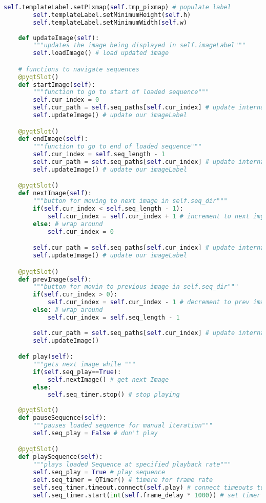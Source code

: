 \begin{lstlisting}[language=Python, caption={GUI Impementation Code}, captionpos=b, label={lst:gui}]
        self.templateLabel.setPixmap(self.tmp_pixmap) # populate label
        self.templateLabel.setMinimumHeight(self.h)
        self.templateLabel.setMinimumWidth(self.w)
        
    def updateImage(self):
        """updates the image being displayed in self.imageLabel"""
        self.loadImage() # load updated image

    # functions to navigate sequences
    @pyqtSlot()
    def startImage(self):
        """function to go to start of loaded sequence"""
        self.cur_index = 0
        self.cur_path = self.seq_paths[self.cur_index] # update internal current image path
        self.updateImage() # update our imageLabel

    @pyqtSlot()
    def endImage(self):
        """function to go to end of loaded sequence"""
        self.cur_index = self.seq_length - 1
        self.cur_path = self.seq_paths[self.cur_index] # update internal current image path
        self.updateImage() # update our imageLabel

    @pyqtSlot()
    def nextImage(self):
        """button for moving to next image in self.seq_dir"""
        if(self.cur_index < self.seq_length - 1):
            self.cur_index = self.cur_index + 1 # increment to next img
        else: # wrap around
            self.cur_index = 0

        self.cur_path = self.seq_paths[self.cur_index] # update internal current image path
        self.updateImage() # update our imageLabel

    @pyqtSlot()
    def prevImage(self):
        """button for movin to previous image in self.seq_dir"""
        if(self.cur_index > 0):
            self.cur_index = self.cur_index - 1 # decrement to prev image
        else: # wrap around
            self.cur_index = self.seq_length - 1
        
        self.cur_path = self.seq_paths[self.cur_index] # update internal current image path
        self.updateImage()

    def play(self):
        """gets next image while """
        if(self.seq_play==True):
            self.nextImage() # get next Image 
        else:
            self.seq_timer.stop() # stop playing
    
    @pyqtSlot()
    def pauseSequence(self):
        """pauses loaded sequence for manual iteration"""
        self.seq_play = False # don't play 

    @pyqtSlot()
    def playSequence(self):
        """plays loaded Sequence at specified playback rate""" 
        self.seq_play = True # play sequence
        self.seq_timer = QTimer() # timere for frame rate
        self.seq_timer.timeout.connect(self.play) # connect timeouts to fetching next image
        self.seq_timer.start(int(self.frame_delay * 1000)) # set timer countdown rate


\end{lstlisting}
